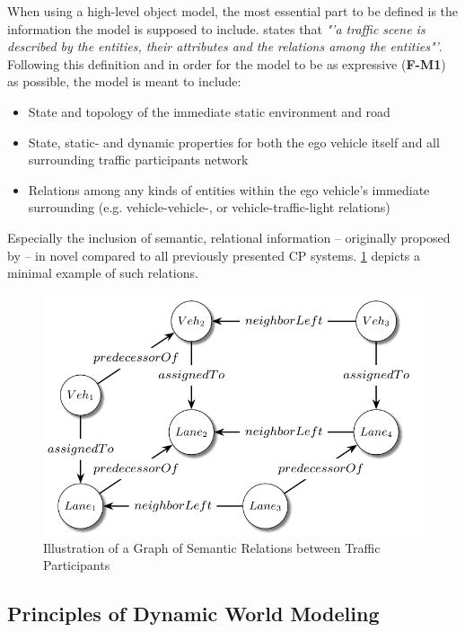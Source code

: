 When using a high-level object model, the most essential part to be defined is the information the model is supposed to include. \cite{Petrich2018} states that \textit{"'a traffic scene is described by the entities, their attributes and the relations among the entities"'}. Following this definition and in order for the model to be as expressive (\textbf{F-M1}) as possible, the model is meant to include:

\begin{itemize}
	\item State and topology of the immediate static environment and road
	\item State, static- and dynamic properties for both the ego vehicle itself and all surrounding traffic participants
	 network
	\item Relations among any kinds of entities within the ego vehicle's immediate surrounding (e.g. vehicle-vehicle-, or vehicle-traffic-light relations)
\end{itemize}

Especially the inclusion of semantic, relational information – originally proposed by \cite{Kohlhaas2014} – in novel compared to all previously presented CP systems. \cref{fig:relations} depicts a minimal example of such relations. 

\begin{figure}
	\centering
	\includegraphics[width=0.5\linewidth]{98_images/relations}
	\caption[Semantic Relations between Traffic Participants]{Illustration of a Graph of Semantic Relations between Traffic Participants \cite{Petrich2018}}
	\label{fig:relations}
\end{figure}

\subsection{Principles of Dynamic World Modeling}
\label{subsec:concept_design:principle_of_dynamic_world_modeling}

